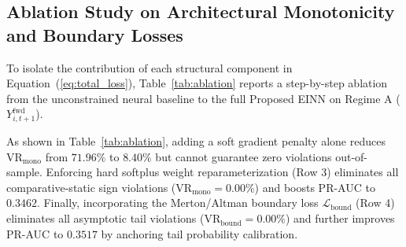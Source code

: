 \documentclass[pdflatex,sn-mathphys-num,twocolumn]{sn-jnl}
\theoremstyle{thmstyleone}
\theoremstyle{thmstyletwo}
\theoremstyle{thmstylethree}
\begin{document}
\subsection{Ablation Study on Architectural Monotonicity and Boundary Losses}
To isolate the contribution of each structural component in Equation~(\ref{eq:total_loss}), Table~\ref{tab:ablation} reports a step-by-step ablation from the unconstrained neural baseline to the full Proposed EINN on Regime A ($Y_{i,t+1}^{\text{fwd}}$).

\begin{table}[t]
\centering
\caption{Ablation study of structural components in Proposed EINN on the out-of-time test cohort ($Y_{i,t+1}^{\text{fwd}}$, $N_{\text{test}}=2,083$).}
\label{tab:ablation}
\footnotesize
\renewcommand{\arraystretch}{1.05}
%
\vspace{-0.4em}
\end{table}

As shown in Table~\ref{tab:ablation}, adding a soft gradient penalty alone reduces $\text{VR}_{\text{mono}}$ from $71.96\%$ to $8.40\%$ but cannot guarantee zero violations out-of-sample. Enforcing hard softplus weight reparameterization (Row 3) eliminates all comparative-static sign violations ($\text{VR}_{\text{mono}} = 0.00\%$) and boosts PR-AUC to $0.3462$. Finally, incorporating the Merton/Altman boundary loss $\mathcal{L}_{\text{bound}}$ (Row 4) eliminates all asymptotic tail violations ($\text{VR}_{\text{bound}} = 0.00\%$) and further improves PR-AUC to $0.3517$ by anchoring tail probability calibration.
\end{document}
